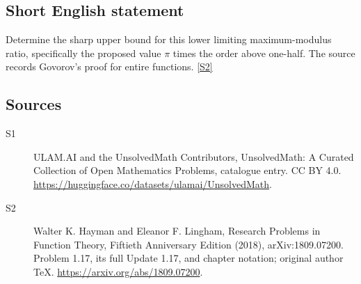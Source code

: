 \documentclass[11pt]{article}
\newcommand{\sref}[2]{\hyperlink{source:#1:#2}{[S#2]}}
\begin{document}
\subsection{Short English statement}
Determine the sharp upper bound for this lower limiting maximum-modulus ratio, specifically the proposed value $\pi$ times the order above one-half. The source records Govorov’s proof for entire functions. \sref{statement}{2}
\subsection{Sources}
\begin{description}
\item[\hypertarget{source:statement:1}{S1}] ULAM.AI and the UnsolvedMath Contributors, UnsolvedMath: A Curated Collection of Open Mathematics Problems, catalogue entry. CC BY 4.0. \url{https://huggingface.co/datasets/ulamai/UnsolvedMath}.
\item[\hypertarget{source:statement:2}{S2}] Walter K. Hayman and Eleanor F. Lingham, Research Problems in Function Theory, Fiftieth Anniversary Edition (2018), arXiv:1809.07200. Problem 1.17, its full Update 1.17, and chapter notation; original author TeX. \url{https://arxiv.org/abs/1809.07200}.
\end{description}
\label{end:statement}
\end{document}
